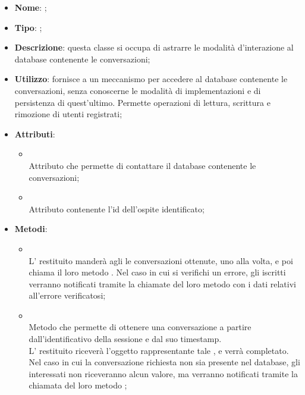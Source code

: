 \begin{itemize}
	\item \textbf{Nome}: ;
	\item \textbf{Tipo}: ;
	\item \textbf{Descrizione}: questa classe si occupa di astrarre le modalità d'interazione al database contenente le conversazioni;
	\item \textbf{Utilizzo}: fornisce a  un meccanismo per accedere al database contenente le conversazioni, senza conoscerne le modalità di implementazioni e di persistenza di quest'ultimo. Permette operazioni di lettura, scrittura e rimozione di utenti registrati;
	\item \textbf{Attributi}:
	\begin{itemize}
		\item[]  \\
		Attributo che permette di contattare il database contenente le conversazioni;
		\item[]  \\
		Attributo contenente l'id dell'ospite identificato;
	\end{itemize}
	\item \textbf{Metodi}:
	\begin{itemize}
		\item[]  \\
		L' restituito manderà agli  le conversazioni ottenute, uno alla volta, e poi chiama il loro metodo . Nel caso in cui si verifichi un errore, gli  iscritti verranno notificati tramite la chiamate del loro metodo  con i dati relativi all'errore verificatosi;\\
		\item[]  \\
		Metodo che permette di ottenere una conversazione a partire dall'identificativo della sessione e dal suo timestamp. \\ L' restituito riceverà l'oggetto rappresentante tale , e verrà completato. Nel caso in cui la conversazione richiesta non sia presente nel database, gli  interessati non riceveranno alcun valore, ma verranno notificati tramite la chiamata del loro metodo ;\\

\end{itemize}
\end{itemize}
